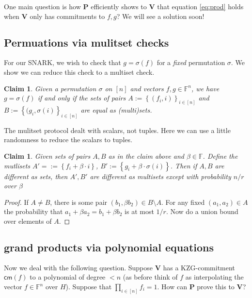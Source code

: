 \documentclass[11pt]{article} %
\newcommand{\F}{\ensuremath{\mathbb F}\xspace}
\newcommand{\cm}{\ensuremath{\mathsf{cm}}\xspace}
\newcommand{\defeq}{:=}
\newcommand{\prv}{\ensuremath{\mathsf{\mathbf{P}}}\xspace}
\newcommand{\ver}{\ensuremath{\mathsf{\mathbf{V}}}\xspace}
\newcommand{\set}[1]{\ensuremath{\left\{#1\right\}}\xspace}
\newtheorem{claim}[lemma]{Claim}
\begin{document}
One main question is how \prv efficiently shows to \ver that equation \ref{eq:prod} holds when \ver only 
has commitments to $f,g$? We will see a solution soon!
\subsection{Permuations via mulitset checks}
For our SNARK, we wish to check that $g=\sigma(f)$ for a \emph{fixed} permutation $\sigma$.
We show we can reduce this check to a multiset check.
\begin{claim}
 Given a permutation $\sigma$ on $[n]$ and vectors $f,g\in \F^n$, we have $g=\sigma(f)$ if and only if
 the sets of pairs $A\defeq \set{(f_i,i)}_{i\in [n]}$ and $B\defeq \set{(g_{i},\sigma(i)}_{i\in [n]}$
 are equal as (multi)sets.
\end{claim}

The mulitset protocol dealt with scalars, not tuples.
Here we can use a little randomness to reduce the scalars to tuples.
\begin{claim}
 Given sets of pairs $A,B$ as in the claim above and $\beta \in \F$.
 Define the mutlisets $A'=\defeq \set{f_i+\beta \cdot i}$, $B'\defeq \set{g_i + \beta \cdot \sigma(i)}$.
 Then if $A,B$ are different as sets, then $A',B'$ are different as multisets except with probability $n/r$ over $\beta$
\end{claim}
\begin{proof}
If $A\neq B$, there is some pair $(b_1,\beta b_2)\in B\setminus A$.
For any fixed $(a_1,a_2)\in A$ the probability that $a_1+\beta a_2= b_1+\beta b_2$ is at most $1/r$.
Now do a union bound over elements of $A$.
\end{proof}


\subsection{grand products via polynomial equations}
Now we deal with the following question. Suppose \ver has a KZG-commitment $\cm(f)$ to a polynomial of degree $<n$ (as before 
think of $f$ as interpolating the vector $f\in \F^n$ over $H$).
Suppose that $\prod_{i\in [n]} f_i =1$.  How can \prv prove this to \ver?
\end{document}
